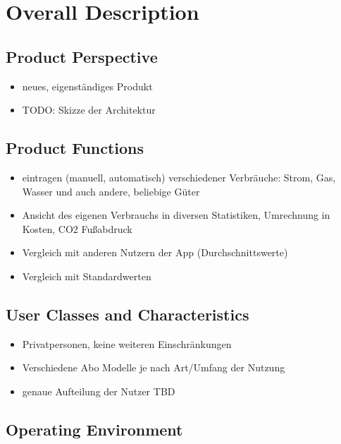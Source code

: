 \section{Overall Description}


\subsection{Product Perspective}

\begin{itemize}
    \item neues, eigenständiges Produkt
    \item TODO: Skizze der Architektur
\end{itemize}

\subsection{Product Functions}

\begin{itemize}
    \item eintragen (manuell, automatisch) verschiedener Verbräuche: Strom, Gas, Wasser und auch andere, beliebige Güter
    \item Ansicht des eigenen Verbrauchs in diversen Statistiken, Umrechnung in Kosten, CO2 Fußabdruck
    \item Vergleich mit anderen Nutzern der App (Durchschnittswerte)
    \item Vergleich mit Standardwerten
\end{itemize}

\subsection{User Classes and Characteristics}

\begin{itemize}
    \item Privatpersonen, keine weiteren Einschränkungen
    \item Verschiedene Abo Modelle je nach Art/Umfang der Nutzung
    \item genaue Aufteilung der Nutzer TBD
\end{itemize}

\subsection{Operating Environment}

